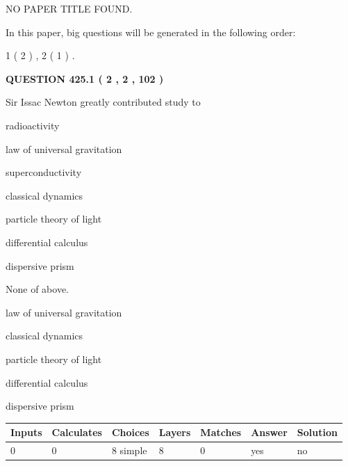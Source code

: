 \documentclass[12pt]{article}
\begin{document}
   
   
   
 NO PAPER TITLE FOUND.
   
   
   
\vspace{0.2in}
   
In this paper, big questions will be generated in the following order: 
   
   
   1 ( 2 )
 ,
   2 ( 1 )
 .
  
\vspace{0.2in}
  
{\textbf{\Large{QUESTION
425.1 
 ( 2 , 2 , 102 )
}}}
  
  
Sir Issac Newton greatly contributed study to
 
 
radioactivity
 
 
law of universal gravitation
 
 
superconductivity
 
 
classical dynamics
 
 
particle theory of light
 
 
differential calculus
 
 
dispersive prism
 
 
 None of above.
 
 
\noindent{}
 
 
law of universal gravitation
 
 
classical dynamics
 
 
particle theory of light
 
 
differential calculus
 
 
dispersive prism
 
 
\noindent{}
 
 
   
   
   
   
\noindent\begin{tabular}{|l|l|l|l|l|l|l|}
 \hline
Inputs & Calculates & Choices & Layers & Matches & Answer & Solution \\ \hline
 0  & 
 0  & 
 8
  simple  
  & 
 8  & 
 0  & 
  yes & 
  no 
  \\ \hline
 \end{tabular}
   
\end{document}
